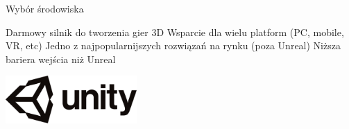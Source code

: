 \begin{frame}{Wybór środowiska}

	\begin{itemize}
		\myitem Darmowy silnik do tworzenia gier 3D
		\myitem Wsparcie dla wielu platform (PC, mobile, VR, etc)
		\myitem Jedno z najpopularnijszych rozwiązań na rynku (poza Unreal\textregistered)
		\myitem Niższa bariera wejścia niż Unreal\textregistered
	\end{itemize}

	\vspace{2cm}
	{\hspace*{5cm}\includegraphics[width=5cm]{figures/Unity_logo.png}}

\end{frame}
